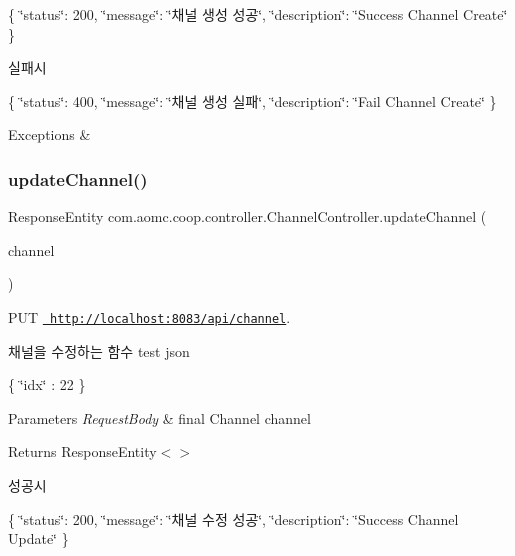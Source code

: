 \{ \char`\"{}status\char`\"{}\+: 200, \char`\"{}message\char`\"{}\+: \char`\"{}채널 생성 성공\char`\"{}, \char`\"{}description\char`\"{}\+: \char`\"{}\+Success Channel Create\char`\"{} \}

실패시

\{ \char`\"{}status\char`\"{}\+: 400, \char`\"{}message\char`\"{}\+: \char`\"{}채널 생성 실패\char`\"{}, \char`\"{}description\char`\"{}\+: \char`\"{}\+Fail Channel Create\char`\"{} \}


\begin{DoxyExceptions}{Exceptions}
{\em } & \\
\hline
\end{DoxyExceptions}
\mbox{\label{classcom_1_1aomc_1_1coop_1_1controller_1_1_channel_controller_adbe3375ab0a4097aa0dd80ff02a19690}} 
\subsubsection{\texorpdfstring{updateChannel()}{updateChannel()}}
{\footnotesize\ttfamily Response\+Entity com.\+aomc.\+coop.\+controller.\+Channel\+Controller.\+update\+Channel (\begin{DoxyParamCaption}\item[{@Request\+Body final Channel}]{channel }\end{DoxyParamCaption})}



P\+UT \href{http://localhost:8083/api/channel}{\texttt{ http\+://localhost\+:8083/api/channel}}. 

채널을 수정하는 함수 test json

\{ \char`\"{}idx\char`\"{} \+: 22 \}


\begin{DoxyParams}{Parameters}
{\em Request\+Body} & final Channel channel\\
\hline
\end{DoxyParams}
\begin{DoxyReturn}{Returns}
Response\+Entity$<$$>$
\end{DoxyReturn}
성공시

\{ \char`\"{}status\char`\"{}\+: 200, \char`\"{}message\char`\"{}\+: \char`\"{}채널 수정 성공\char`\"{}, \char`\"{}description\char`\"{}\+: \char`\"{}\+Success Channel Update\char`\"{} \}

